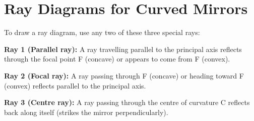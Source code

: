 \begin{diagbox}
\begin{center}
\end{center}
\end{diagbox}

\section{Ray Diagrams for Curved Mirrors}

\begin{processbox}
To draw a ray diagram, use any two of these three
special rays:

\textbf{Ray 1 (Parallel ray):} A ray travelling
parallel to the principal axis reflects through the
focal point F (concave) or appears to come from F
(convex).

\textbf{Ray 2 (Focal ray):} A ray passing through
F (concave) or heading toward F (convex) reflects
parallel to the principal axis.

\textbf{Ray 3 (Centre ray):} A ray passing through
the centre of curvature C reflects back along itself
(strikes the mirror perpendicularly).
\end{processbox}

